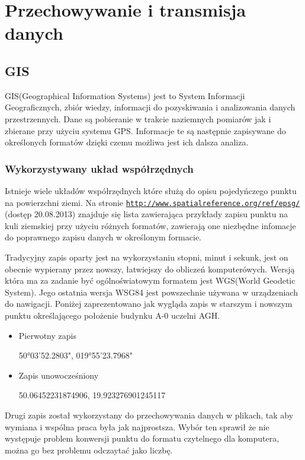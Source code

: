 \clearpage
\newpage
\section{Przechowywanie i transmisja danych}
\label{sec:przesyl}

\subsection{GIS}
\label{subsec:gis}

GIS(Geographical Information Systems) jest to System Informacji Geograficznych, zbiór wiedzy, informacji do pozyskiwania i analizowania danych przestrzennych. Dane są pobieranie w trakcie naziemnych pomiarów jak i zbierane przy użyciu systemu GPS. Informacje te są następnie zapisywane do określonych formatów dzięki czemu możliwa jest ich dalsza analiza. 

\subsubsection{Wykorzystywany układ współrzędnych}
\label{subsec:uklad}

Istnieje wiele układów współrzędnych które służą do opisu pojedyńczego punktu na powierzchni ziemi. Na stronie \underline{\texttt{http://www.spatialreference.org/ref/epsg/}} (dostęp 20.08.2013) znajduje się lista zawierająca przykłady zapisu punktu na kuli ziemskiej przy użyciu różnych formatów, zawierają one niezbędne infomacje do poprawnego zapisu danych w określonym formacie.

Tradycyjny zapis oparty jest na wykorzystaniu stopni, minut i sekunk, jest on obecnie wypierany przez nowszy, łatwiejszy do obliczeń komputerówych. Wersją która ma za zadanie być ogólnoświatowym formatem jest WGS(World Geodetic System). Jego ostatnia wersja  WSG84 jest powszechnie używana w urządzeniach do nawigacji. Poniżej zaprezentowano jak wygląda zapis w starszym i nowszym punktu określającego położenie budynku A-0 uczelni AGH.

\begin{itemize}

\item
Pierwotny zapis

50°03'52.2803", 019°55'23.7968"
\item
Zapis unowocześniony

50.06452231874906, 19.923276901245117
\end{itemize}

Drugi zapis został wykorzystany do przechowywania danych w plikach, tak aby wymiana i wspólna praca była jak najprostsza. Wybór ten sprawił że nie występuje problem konwersji punktu do formatu czytelnego dla komputera, można go bez problemu odczaytać jako liczbę.

